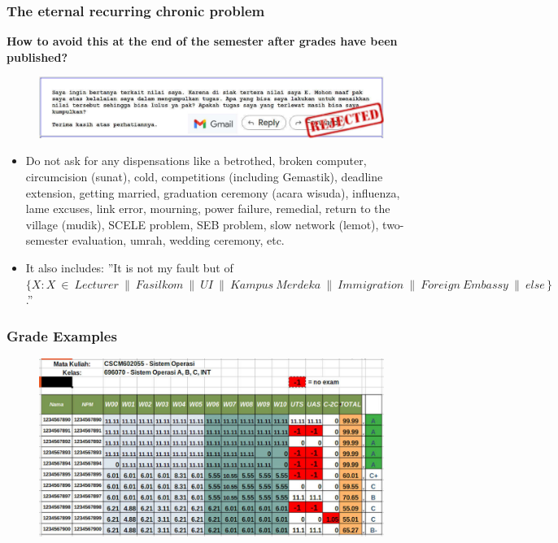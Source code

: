 \documentclass[aspectratio=169, xcolor=table, notheorems, hyperref={pdfpagelabels=false}]{beamer}
\begin{document}
\begin{frame}[fragile]
\frametitle{The eternal recurring chronic problem} 

\textbf{How to avoid this at the end of the semester after grades have been published?}

\begin{figure}
\includegraphics[width=1.01\linewidth]{os-appeal}
\end{figure}

\begin{itemize}
\item Do not ask for any dispensations like a betrothed, broken computer, circumcision (sunat), cold, competitions
      (including Gemastik), deadline extension, getting married, graduation ceremony (acara wisuda),
      influenza, lame excuses, link error, mourning,
      power failure, remedial, return to the village (mudik), SCELE problem, SEB problem, slow network (lemot), 
      two-semester evaluation, umrah,
      wedding ceremony, etc.
\item It also includes: ''It is not my fault but of $\{ X\!: X\ \in\ Lecturer\ \parallel\ Fasilkom\
      \parallel\ UI\ \parallel\ Kampus\ Merdeka\ \parallel\ Immigration\ \parallel\ Foreign\ Embassy\ \parallel\
      else\, \}$.''
\end{itemize}

\end{frame}

\begin{frame}[fragile]
\frametitle{Grade Examples}

\begin{figure}
\includegraphics[width=0.94\linewidth]{os-siak}
\end{figure}

\end{frame}
\end{document}

